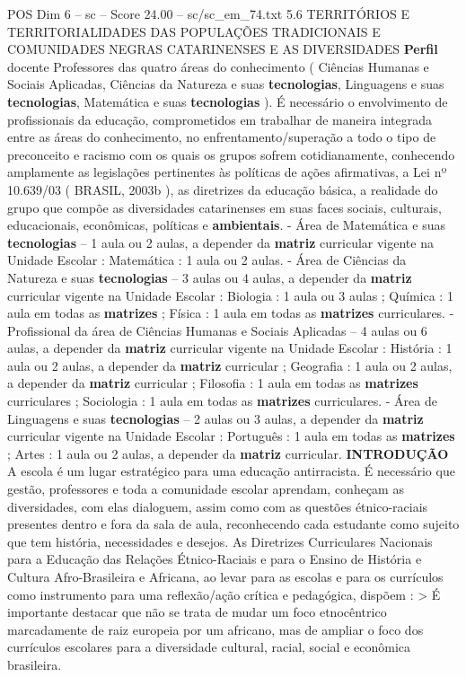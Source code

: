 \begin{textsample}{POS Dim 6 – sc – Score 24.00 – sc/sc\_em\_74.txt}  \label{ex:f6_pos_015}
5.6 TERRITÓRIOS E TERRITORIALIDADES DAS POPULAÇÕES TRADICIONAIS E COMUNIDADES NEGRAS CATARINENSES E AS DIVERSIDADES \textbf{Perfil} docente Professores das quatro áreas do conhecimento ( Ciências Humanas e Sociais Aplicadas, Ciências da Natureza e suas \textbf{tecnologias}, Linguagens e suas \textbf{tecnologias}, Matemática e suas \textbf{tecnologias} ).
É necessário o envolvimento de profissionais da educação, comprometidos em trabalhar de maneira integrada entre as áreas do conhecimento, no enfrentamento/superação a todo o tipo de preconceito e racismo com os quais os grupos sofrem cotidianamente, conhecendo amplamente as legislações pertinentes às políticas de ações afirmativas, a Lei nº 10.639/03 ( BRASIL, 2003b ), as diretrizes da educação básica, a realidade do grupo que compõe as diversidades catarinenses em suas faces sociais, culturais, educacionais, econômicas, políticas e \textbf{ambientais}. - Área de Matemática e suas \textbf{tecnologias} – 1 aula ou 2 aulas, a depender da \textbf{matriz} curricular vigente na Unidade Escolar : Matemática : 1 aula ou 2 aulas. - Área de Ciências da Natureza e suas \textbf{tecnologias} – 3 aulas ou 4 aulas, a depender da \textbf{matriz} curricular vigente na Unidade Escolar : Biologia : 1 aula ou 3 aulas ; Química : 1 aula em todas as \textbf{matrizes} ; Física : 1 aula em todas as \textbf{matrizes} curriculares. - Profissional da área de Ciências Humanas e Sociais Aplicadas – 4 aulas ou 6 aulas, a depender da \textbf{matriz} curricular vigente na Unidade Escolar : História : 1 aula ou 2 aulas, a depender da \textbf{matriz} curricular ; Geografia : 1 aula ou 2 aulas, a depender da \textbf{matriz} curricular ; Filosofia : 1 aula em todas as \textbf{matrizes} curriculares ; Sociologia : 1 aula em todas as \textbf{matrizes} curriculares. - Área de Linguagens e suas \textbf{tecnologias} – 2 aulas ou 3 aulas, a depender da \textbf{matriz} curricular vigente na Unidade Escolar : Português : 1 aula em todas as \textbf{matrizes} ; Artes : 1 aula ou 2 aulas, a depender da \textbf{matriz} curricular. \textbf{INTRODUÇÃO} A escola é um lugar estratégico para uma educação antirracista.
É necessário que gestão, professores e toda a comunidade escolar aprendam, conheçam as diversidades, com elas dialoguem, assim como com as questões étnico-raciais presentes dentro e fora da sala de aula, reconhecendo cada estudante como sujeito que tem história, necessidades e desejos.
As Diretrizes Curriculares Nacionais para a Educação das Relações Étnico-Raciais e para o Ensino de História e Cultura Afro-Brasileira e Africana, ao levar para as escolas e para os currículos como instrumento para uma reflexão/ação crítica e pedagógica, dispõem : > É importante destacar que não se trata de mudar um foco etnocêntrico marcadamente de raiz europeia por um africano, mas de ampliar o foco dos currículos escolares para a diversidade cultural, racial, social e econômica brasileira.

\end{textsample}
